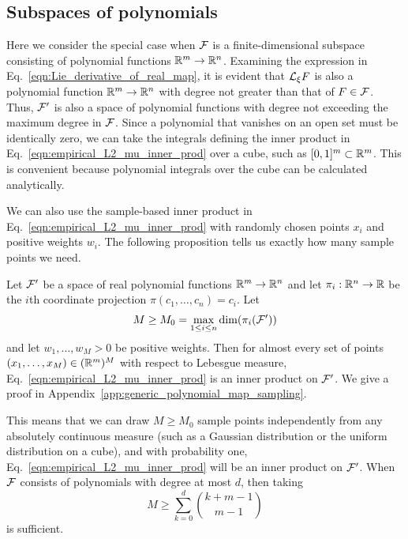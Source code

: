 \documentclass[twoside,11pt]{article}
\begin{document}
\subsection{Subspaces of polynomials}
Here we consider the special case when ${\mathcal{F}}$ is a finite-dimensional subspace consisting of polynomial functions $\mathbb{R}^m \to \mathbb{R}^n$.
Examining the expression in Eq.~\ref{eqn:Lie_derivative_of_real_map}, it is evident that ${\mathcal{L}}_\xi F$ is also a polynomial function $\mathbb{R}^m \to \mathbb{R}^n$ with degree not greater than that of $F\in{\mathcal{F}}$.
Thus, ${\mathcal{F}}'$ is also a space of polynomial functions with degree not exceeding the maximum degree in ${\mathcal{F}}$.
Since a polynomial that vanishes on an open set must be identically zero, we can take the integrals defining the inner product in Eq.~\ref{eqn:empirical_L2_mu_inner_prod} over a cube, such as $[0,1]^m\subset \mathbb{R}^m$.
This is convenient because polynomial integrals over the cube can be calculated analytically.

We can also use the sample-based inner product in Eq.~\ref{eqn:empirical_L2_mu_inner_prod} with randomly chosen points $x_i$ and positive weights $w_i$.
The following proposition tells us exactly how many sample points we need.
\begin{proposition}
    \label{prop:generic_polynomial_map_sampling}
    Let ${\mathcal{F}}'$ be a space of real polynomial functions $\mathbb{R}^m \to \mathbb{R}^n$ and let $\pi_i:\mathbb{R}^n \to \mathbb{R}$ be the $i$th coordinate projection $\pi(c_1, \ldots, c_n) = c_i$.
    Let 
    \begin{equation}
        M \geq M_0 = \max_{1\leq i \leq n} \dim(\pi_i ({\mathcal{F}}'))
    \end{equation}
    and let $w_1, \ldots, w_M > 0$ be positive weights.
    Then for almost every set of points $(x_1, \ldots, x_M) \in (\mathbb{R}^m)^M$ with respect to Lebesgue measure, Eq.~\ref{eqn:empirical_L2_mu_inner_prod} is an inner product on ${\mathcal{F}}'$.  
    We give a proof in Appendix~\ref{app:generic_polynomial_map_sampling}.
\end{proposition}
This means that we can draw $M \geq M_0$ sample points independently from any absolutely continuous measure (such as a Gaussian distribution or the uniform distribution on a cube), and with probability one,  Eq.~\ref{eqn:empirical_L2_mu_inner_prod} will be an inner product on ${\mathcal{F}}'$.
When ${\mathcal{F}}$ consists of polynomials with degree at most $d$, then taking
\begin{equation}
    M \geq \sum_{k=0}^d \binom{k+m-1}{m-1}
\end{equation}
is sufficient.
\end{document}
